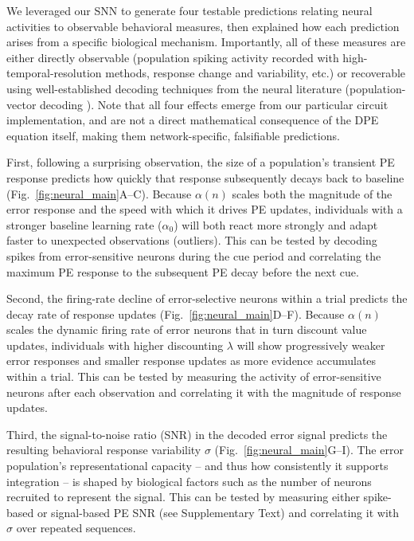 \begin{ms}
We leveraged our SNN to generate four testable predictions relating neural activities to observable behavioral measures, then explained how each prediction arises from a specific biological mechanism. Importantly, all of these measures are either directly observable (population spiking activity recorded with high-temporal-resolution methods, response change and variability, etc.) or recoverable using well-established decoding techniques from the neural literature (population-vector decoding \citep{georgopoulos1986neuronal, wu2006bayesian}). Note that all four effects emerge from our particular circuit implementation, and are not a direct mathematical consequence of the DPE equation itself, making them network-specific, falsifiable predictions.

First, following a surprising observation, the size of a population's transient PE response predicts how quickly that response subsequently decays back to baseline (Fig.~\ref{fig:neural_main}A--C). Because $\alpha(n)$ scales both the magnitude of the error response and the speed with which it drives PE updates, individuals with a stronger baseline learning rate ($\alpha_0$) will both react more strongly and adapt faster to unexpected observations (outliers). This can be tested by decoding spikes from error-sensitive neurons during the cue period and correlating the maximum PE response to the subsequent PE decay before the next cue.

Second, the firing-rate decline of error-selective neurons within a trial predicts the decay rate of response updates (Fig.~\ref{fig:neural_main}D--F). Because $\alpha(n)$ scales the dynamic firing rate of error neurons that in turn discount value updates, individuals with higher discounting $\lambda$ will show progressively weaker error responses and smaller response updates as more evidence accumulates within a trial. This can be tested by measuring the activity of error-sensitive neurons after each observation and correlating it with the magnitude of response updates.

Third, the signal-to-noise ratio (SNR) in the decoded error signal predicts the resulting behavioral response variability $\sigma$ (Fig.~\ref{fig:neural_main}G--I). The error population's representational capacity -- and thus how consistently it supports integration -- is shaped by biological factors such as the number of neurons recruited to represent the signal. This can be tested by measuring either spike-based or signal-based PE SNR (see Supplementary Text) and correlating it with $\sigma$ over repeated sequences.


\end{ms}
